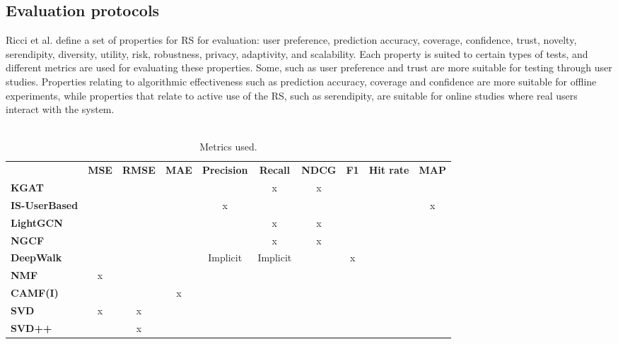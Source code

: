 \subsection{Evaluation protocols}\label{sec:evaluationmetrics}
Ricci et al.\cite{RecommenderHandbook2015} define a set of properties for RS for evaluation: user preference, prediction accuracy, coverage, confidence, trust, novelty, serendipity, diversity, utility, risk, robustness, privacy, adaptivity, and scalability.
Each property is suited to certain types of tests, and different metrics are used for evaluating these properties.
Some, such as user preference and trust are more suitable for testing through user studies.
Properties relating to algorithmic effectiveness such as prediction accuracy, coverage and confidence are more suitable for offline experiments, while properties that relate to active use of the RS, such as serendipity, are suitable for online studies where real users interact with the system.
\\\\
\begin{table*}[!htp]\centering
    \caption{Metrics used.}\label{tab:metricsused}
    \scriptsize
    \begin{tabular}{lccccccccc}\toprule
    &\textbf{MSE} &\textbf{RMSE} &\textbf{MAE} &\textbf{Precision} &\textbf{Recall} &\textbf{NDCG} &\textbf{F1} &\textbf{Hit rate} &\textbf{MAP} \\\cmidrule{2-10}
    \textbf{KGAT\cite{KGAT}} & & & & & x & x & & & \\\cmidrule{1-10}
    \textbf{IS-UserBased\cite{GraphBasedCollaborativePaper}} & & & & x & & & & & x \\\cmidrule{1-10}
    \textbf{LightGCN\cite{LightGCN}} & & & & & x & x & & & \\\cmidrule{1-10}
    \textbf{NGCF\cite{NGCF} } & & & & & x & x & & & \\\cmidrule{1-10}
    \textbf{DeepWalk\cite{DeepWalk}} & & & & Implicit & Implicit & & x & & \\\cmidrule{1-10}
    \textbf{NMF\cite{NMF} } & x & & & & & & & & \\\cmidrule{1-10}
    \textbf{CAMF(I)\cite{baltrunasCAMF} } & & & x & & & & & & \\\cmidrule{1-10}
    \textbf{SVD\cite{standardMF} } & x & x & & & & & & & \\\cmidrule{1-10}
    \textbf{SVD++\cite{svd++} } & & x & & & & & & & \\\cmidrule{1-10}
    \bottomrule
    \end{tabular}
\end{table*}
